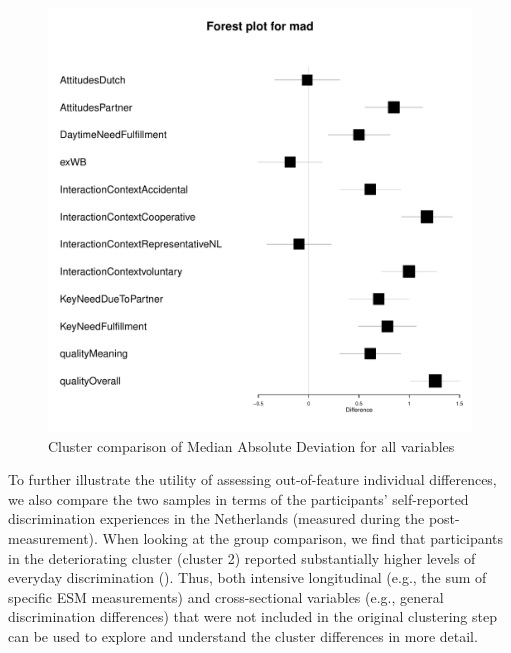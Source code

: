 \begin{figure}[!ht] %
  \caption{Cluster comparison of Median Absolute Deviation for all variables}
  \label{fig:cluster_comparison_mad}
  \centering\includegraphics[width=\textwidth]{figures/feature_comparison_mad.pdf}
\end{figure}

To further illustrate the utility of assessing out-of-feature individual
differences, we also compare the two samples in terms of the
participants' self-reported discrimination experiences in the
Netherlands (measured during the post-measurement). When looking at the
group comparison, we find that participants in the deteriorating cluster
(cluster 2) reported substantially higher levels of everyday
discrimination (). Thus, both intensive
longitudinal (e.g., the sum of specific ESM measurements) and
cross-sectional variables (e.g., general discrimination differences)
that were not included in the original clustering step can be used to
explore and understand the cluster differences in more detail.

